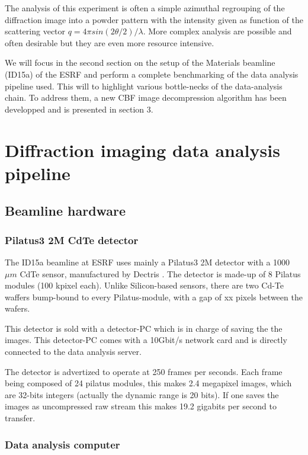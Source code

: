 \documentclass[preprint, pdf]{iucr}              %
\begin{document}
The analysis of this experiment is often a simple azimuthal regrouping of the
diffraction image into a powder pattern with the intensity given as function of
the scattering vector $q=4 \pi sin (2\theta/2)/\lambda$. 
More complex analysis are possible and often desirable but they are even more
resource intensive.

We will focus in the second section on the setup of the Materials beamline
(ID15a) of the ESRF and perform a complete benchmarking of the data analysis 
pipeline used. This will to highlight various bottle-necks of the data-analysis
chain.
To address them, a new CBF image decompression algorithm has been developped and
is presented in section 3. 

\section{Diffraction imaging data analysis pipeline}

\subsection{Beamline hardware}

\subsubsection{Pilatus3 2M CdTe detector}

The ID15a beamline at ESRF uses mainly a Pilatus3 2M detector with a 1000 $\mu
m$ CdTe sensor, manufactured by Dectris \cite{dectris}. 
The detector is made-up of 8 Pilatus modules (100 kpixel each).
Unlike Silicon-based sensors, there are two Cd-Te waffers bump-bound to every
Pilatus-module, with a gap of xx pixels between the wafers.

This detector is sold with a detector-PC which is in charge of saving the
the images. 
This detector-PC comes with a 10Gbit/s network card and is directly connected to
the data analysis server.

The detector is advertized to operate at 250 frames per seconds. 
Each frame being composed of 24 pilatus modules, this makes 2.4 megapixel
images, which are 32-bits integers (actually the dynamic range is 20 bits).
If one saves the images as uncompressed raw stream this makes 19.2 gigabits per
second to transfer.

\subsubsection{Data analysis computer}
\end{document}
